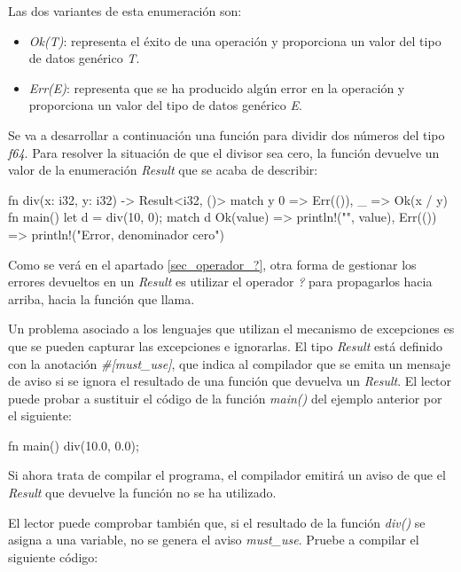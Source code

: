 Las dos variantes de esta enumeración son:

\begin{itemize}
   \item \textit{Ok(T)}: representa el éxito de una operación y proporciona un valor del tipo de datos genérico \textit{T}.
   
   \item \textit{Err(E)}: representa que se ha producido algún error en la
   operación y proporciona un valor del tipo de datos genérico \textit{E}.
\end{itemize}

Se va a desarrollar a continuación una función para dividir dos números del tipo \textit{f64}. Para resolver la situación de que el divisor sea cero, la función devuelve un valor de la enumeración \textit{Result} que se acaba de describir:

\begin{Codigo}
   fn div(x: i32, y: i32) -> Result<i32, ()> {
      match y {
         0 => Err(()),
         _ => Ok(x / y)
      }
   }
   fn main() {
      let d = div(10, 0);
      match d {
         Ok(value) => println!("{}", value),
         Err(()) => println!("Error, denominador cero")
      }
   }
\end{Codigo}

Como se verá en el apartado \ref{sec_operador_?}, otra forma de gestionar los errores devueltos en un \textit{Result} es utilizar el operador \textit{?} para propagarlos hacia arriba, hacia la función que llama.

Un problema asociado a los lenguajes que utilizan el mecanismo de excepciones es que se pueden capturar las excepciones e ignorarlas. El tipo \textit{Result} está definido con la anotación \textit{\#[must\_use]}, que indica al compilador que se emita un mensaje de aviso si se ignora el resultado de una función que devuelva un \textit{Result}. El lector puede probar a sustituir el código de la función \textit{main()} del ejemplo anterior por el siguiente:

\begin{Codigo}
   fn main() {
      div(10.0, 0.0);
   }
\end{Codigo}

Si ahora trata de compilar el programa, el compilador emitirá un aviso de que el \textit{Result} que devuelve la función no se ha utilizado. 

El lector puede comprobar también que, si el resultado de la función \textit{div()} se asigna a una variable, no se genera el aviso \textit{must\_use}. Pruebe a compilar el siguiente código:

